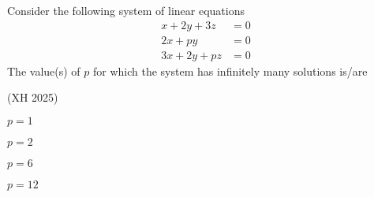 \item Consider the following system of linear equations
	\begin{align*}
x + 2y + 3z &= 0\\ 
2x + py &= 0\\ 
3x + 2y + pz &= 0
\end{align*}
The value(s) of $p$ for which the system has infinitely many solutions is/are

\hfill (XH 2025)
\begin{enumerate}
\begin{multicols}{4}
\item $p=1$
\item $p=2$
\item $p=6$
\item $p=12$
\end{multicols}
\end{enumerate}

